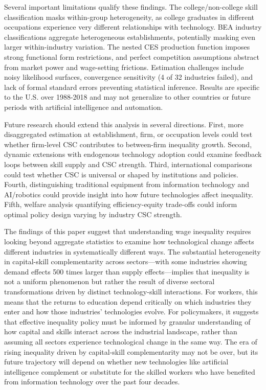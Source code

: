 \documentclass[12pt]{article}
\begin{document}
Several important limitations qualify these findings. The college/non-college skill classification masks within-group heterogeneity, as college graduates in different occupations experience very different relationships with technology. BEA industry classifications aggregate heterogeneous establishments, potentially masking even larger within-industry variation. The nested CES production function imposes strong functional form restrictions, and perfect competition assumptions abstract from market power and wage-setting frictions. Estimation challenges include noisy likelihood surfaces, convergence sensitivity (4 of 32 industries failed), and lack of formal standard errors preventing statistical inference. Results are specific to the U.S. over 1988-2018 and may not generalize to other countries or future periods with artificial intelligence and automation.

Future research should extend this analysis in several directions. First, more disaggregated estimation at establishment, firm, or occupation levels could test whether firm-level CSC contributes to between-firm inequality growth. Second, dynamic extensions with endogenous technology adoption could examine feedback loops between skill supply and CSC strength. Third, international comparisons could test whether CSC is universal or shaped by institutions and policies. Fourth, distinguishing traditional equipment from information technology and AI/robotics could provide insight into how future technologies affect inequality. Fifth, welfare analysis quantifying efficiency-equity trade-offs could inform optimal policy design varying by industry CSC strength.

The findings of this paper suggest that understanding wage inequality requires looking beyond aggregate statistics to examine how technological change affects different industries in systematically different ways. The substantial heterogeneity in capital-skill complementarity across sectors---with some industries showing demand effects 500 times larger than supply effects---implies that inequality is not a uniform phenomenon but rather the result of diverse sectoral transformations driven by distinct technology-skill interactions. For workers, this means that the returns to education depend critically on which industries they enter and how those industries' technologies evolve. For policymakers, it suggests that effective inequality policy must be informed by granular understanding of how capital and skills interact across the industrial landscape, rather than assuming all sectors experience technological change in the same way. The era of rising inequality driven by capital-skill complementarity may not be over, but its future trajectory will depend on whether new technologies like artificial intelligence complement or substitute for the skilled workers who have benefited from information technology over the past four decades. 
\end{document}
